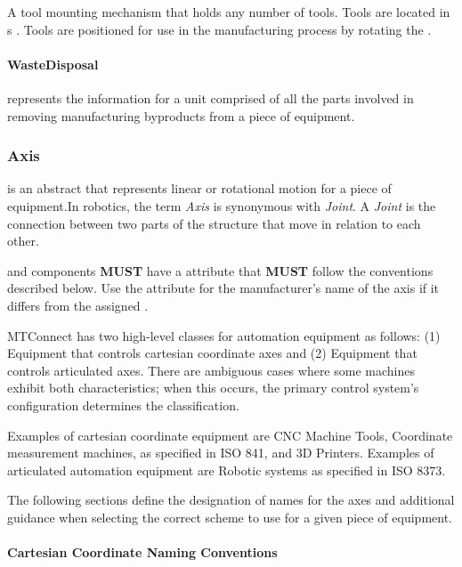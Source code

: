 A tool mounting mechanism that holds any number of tools. Tools are located in s . Tools are positioned for use in the manufacturing process by rotating the .


\paragraph{WasteDisposal}\mbox{}
\label{sec:WasteDisposal}


 represents the information for a unit comprised of all the parts involved in removing manufacturing byproducts from a piece of equipment.



\subsubsection{Axis}
\label{sec:Axis}



 is an abstract  that represents linear or rotational motion for a piece of equipment.In robotics, the term \textit{Axis} is synonymous with \textit{Joint}. A \textit{Joint} is the connection between two parts of the structure that move in relation to each other.

 and  components \textbf{MUST} have a  attribute that \textbf{MUST} follow the conventions described below. Use the  attribute for the manufacturer's name of the axis if it differs from the assigned .

\gls{MTConnect} has two high-level classes for automation equipment as follows: (1) Equipment that controls cartesian coordinate axes and (2) Equipment that controls articulated axes. There are ambiguous cases where some machines exhibit both characteristics; when this occurs, the primary control system's configuration determines the classification.

Examples of cartesian coordinate equipment are CNC Machine Tools, Coordinate measurement machines, as specified in ISO 841, and 3D Printers. Examples of articulated automation equipment are Robotic systems as specified in ISO 8373.

The following sections define the designation of names for the axes and additional guidance when selecting the correct scheme to use for a given piece of equipment.

\paragraph{Cartesian Coordinate Naming Conventions}
\label{sec:Cartesian Coordinate Naming Conventions}


